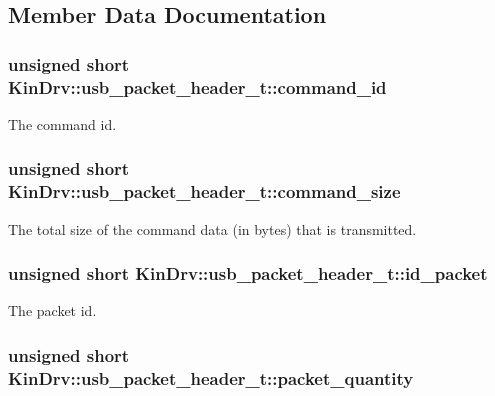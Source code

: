 \subsection{Member Data Documentation}
\hypertarget{structKinDrv_1_1usb__packet__header__t_a7efa30260f38c095ba9d3496fc1f6ca3}{
\subsubsection[{command\+\_\+id}]{\setlength{\rightskip}{0pt plus 5cm}unsigned short Kin\+Drv\+::usb\+\_\+packet\+\_\+header\+\_\+t\+::command\+\_\+id}}\label{structKinDrv_1_1usb__packet__header__t_a7efa30260f38c095ba9d3496fc1f6ca3}
The command id. \hypertarget{structKinDrv_1_1usb__packet__header__t_a1c5726c153fb8c111224abad09f89769}{
\subsubsection[{command\+\_\+size}]{\setlength{\rightskip}{0pt plus 5cm}unsigned short Kin\+Drv\+::usb\+\_\+packet\+\_\+header\+\_\+t\+::command\+\_\+size}}\label{structKinDrv_1_1usb__packet__header__t_a1c5726c153fb8c111224abad09f89769}
The total size of the command data (in bytes) that is transmitted. \hypertarget{structKinDrv_1_1usb__packet__header__t_a960ee443a2288035f5a8dde73156b09a}{
\subsubsection[{id\+\_\+packet}]{\setlength{\rightskip}{0pt plus 5cm}unsigned short Kin\+Drv\+::usb\+\_\+packet\+\_\+header\+\_\+t\+::id\+\_\+packet}}\label{structKinDrv_1_1usb__packet__header__t_a960ee443a2288035f5a8dde73156b09a}
The packet id. \hypertarget{structKinDrv_1_1usb__packet__header__t_a1e7318460cae97671f9f2b2488c25e58}{
\subsubsection[{packet\+\_\+quantity}]{\setlength{\rightskip}{0pt plus 5cm}unsigned short Kin\+Drv\+::usb\+\_\+packet\+\_\+header\+\_\+t\+::packet\+\_\+quantity}}\label{structKinDrv_1_1usb__packet__header__t_a1e7318460cae97671f9f2b2488c25e58}
